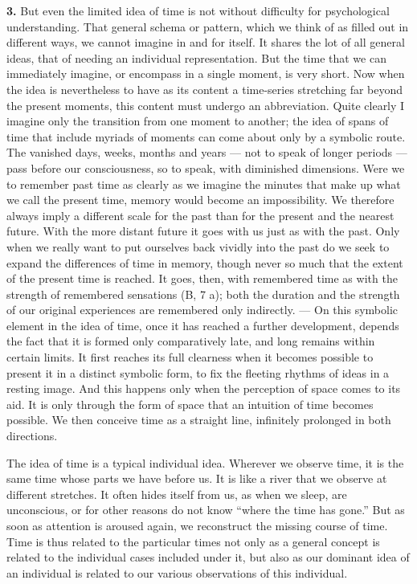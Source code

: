 \documentclass[12pt,a4paper]{book}
\newcommand{\opage}[1]{\marginnote{\footnotesize\textit{[#1]}}}
\begin{document}
\textbf{3.} But even the limited idea of time is not without difficulty
for psychological understanding. That general schema or pattern, which we
think of as filled out in different ways, we cannot imagine in and for
itself. It shares the lot of all general ideas, that of needing an
individual representation. But the time that we can immediately imagine,
or encompass in a single moment, is very short. Now when the idea is
nevertheless to have as its content a time-series stretching far beyond
the present moments, this content must undergo an abbreviation. Quite
clearly I imagine only the transition from one moment to another; the
idea of spans of time that include myriads of moments can come about only
by a symbolic route. The vanished days, weeks, months and years --- not
to speak of longer periods --- pass before our consciousness, so to
speak, with diminished dimensions. Were we to remember past time as
clearly as we imagine the minutes that make up what we call the present
time, memory would become an impossibility. We therefore always imply a
different scale for the past than for the present and the nearest
future. With the more distant future it goes with us just as with the
past. Only when we really want to put ourselves back vividly into the
past do we seek to expand the differences of time in memory, though never
so much that the extent of the present time is reached. It goes, then,
with remembered time as with the strength of remembered sensations (B, 7
a); both the duration and the strength of our original experiences are
remembered only indirectly. --- On this symbolic element in the idea of
time, once it has reached
\opage{231}a further development, depends the fact that it is formed only
comparatively late, and long remains within certain limits. It first
reaches its full clearness when it becomes possible to present it in a
distinct symbolic form, to fix the fleeting rhythms of ideas in a resting
image. And this happens only when the perception of space comes to its
aid. It is only through the form of space that an intuition of time
becomes possible. We then conceive time as a straight line, infinitely
prolonged in both directions.

The idea of time is a typical individual idea. Wherever we observe time,
it is the same time whose parts we have before us. It is like a river
that we observe at different stretches. It often hides itself from us, as
when we sleep, are unconscious, or for other reasons do not know ``where
the time has gone.'' But as soon as attention is aroused again, we
reconstruct the missing course of time. Time is thus related to the
particular times not only as a general concept is related to the
individual cases included under it, but also as our dominant idea of an
individual is related to our various observations of this individual.
\end{document}
